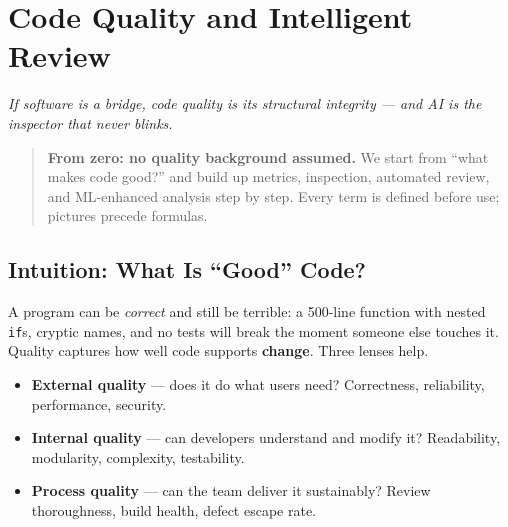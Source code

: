 \chapter{Code Quality and Intelligent Review}\label{ch:quality}
\begin{center}\small\textit{If software is a bridge, code quality is its structural integrity --- and AI is the inspector that never blinks.}\end{center}

\begin{quote}\small\textbf{From zero: no quality background assumed.} We start from ``what makes code good?'' and build up metrics, inspection, automated review, and ML-enhanced analysis step by step. Every term is defined before use; pictures precede formulas.\end{quote}

\noindent{}
\vspace{0.4em}

\section{Intuition: What Is ``Good'' Code?}\label{sec:good-code}
A program can be \emph{correct} and still be terrible: a 500-line function with nested \texttt{if}s, cryptic names, and no tests will break the moment someone else touches it. Quality captures how well code supports \textbf{change}. Three lenses help.

\begin{itemize}[leftmargin=1.2em]
  \item \textbf{External quality} --- does it do what users need? Correctness, reliability, performance, security.
  \item \textbf{Internal quality} --- can developers understand and modify it? Readability, modularity, complexity, testability.
  \item \textbf{Process quality} --- can the team deliver it sustainably? Review thoroughness, build health, defect escape rate.
\end{itemize}

